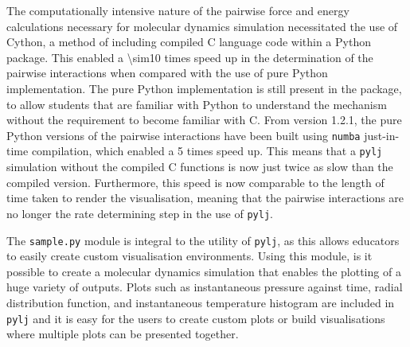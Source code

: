 The computationally intensive nature of the pairwise force and energy calculations necessary for molecular dynamics simulation necessitated the use of Cython, a method of including compiled C language code within a Python package.\autocite{noauthor_cython_nodate}
This enabled a \num{\sim10} times speed up in the determination of the pairwise interactions when compared with the use of pure Python implementation.
The pure Python implementation is still present in the package, to allow students that are familiar with Python to understand the mechanism without the requirement to become familiar with C.
From version 1.2.1,\autocite{mccluskey_arm61/pylj_2019-1} the pure Python versions of the pairwise interactions have been built using \texttt{numba} just-in-time compilation,\autocite{noauthor_numba_nodate} which enabled a \num{5} times speed up.
This means that a \texttt{pylj} simulation without the compiled C functions is now just twice as slow than the compiled version.
Furthermore, this speed is now comparable to the length of time taken to render the visualisation, meaning that the pairwise interactions are no longer the rate determining step in the use of \texttt{pylj}.

The \texttt{sample.py} module is integral to the utility of \texttt{pylj}, as this allows educators to easily create custom visualisation environments.
Using this module, is it possible to create a molecular dynamics simulation that enables the plotting of a huge variety of outputs.
Plots such as instantaneous pressure against time, radial distribution function, and instantaneous temperature histogram are included in \texttt{pylj} and it is easy for the users to create custom plots or build visualisations where multiple plots can be presented together.

